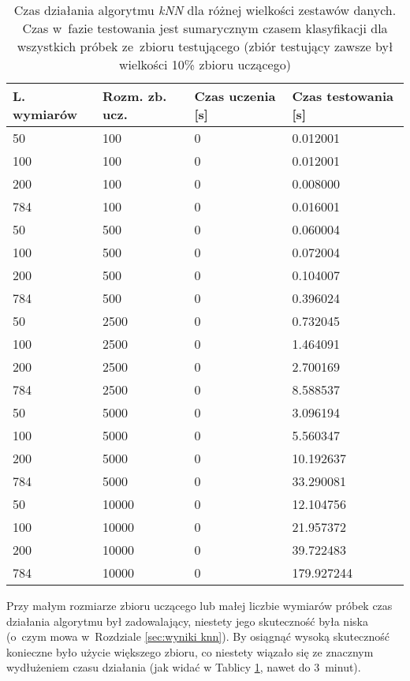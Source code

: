 \documentclass[12pt]{article}
\begin{document}
\begin{table}[H]
\begin{center}
  \begin{tabular}[H]{|l|l|l|l|}
  \hline 
  \rowcolor[gray]{0.9}L. wymiarów & Rozm. zb. ucz. & Czas uczenia [s] & Czas testowania [s]  \\ \hline \hline
  50 &100  & 0 &  0.012001 \\ \hline 
			        100 &100  & 0 &  0.012001 \\ \hline 
			        200 &100  & 0 &  0.008000 \\ \hline  
			        784 &100  & 0 & 0.016001 \\ \hline  
\hline
			        50 &500  & 0 & 0.060004 \\ \hline 
			        100& 500  & 0 & 0.072004 \\ \hline 
			        200& 500  & 0 & 0.104007 \\ \hline 
			        784 &500  & 0 & 0.396024 \\ \hline 
\hline
			        50 &2500  & 0 &  0.732045 \\ \hline  
			        100& 2500  & 0 & 1.464091 \\ \hline  
			        200 &2500  & 0 &  2.700169 \\ \hline 
			        784 &2500 & 0 & 8.588537 \\ \hline  
\hline
			        50 &5000 & 0 & 3.096194 \\ \hline 
			        100 &5000 & 0 & 5.560347 \\ \hline 
			       200 &5000 & 0 & 10.192637 \\ \hline 
			        784 &5000 & 0 & 33.290081 \\ \hline  
\hline
			       50 &10000 & 0 &12.104756 \\ \hline  
			        100 &10000 & 0 &21.957372 \\ \hline  
			        200 &10000 & 0 & 39.722483 \\ \hline 
			        784 &10000 & 0 & 179.927244 \\ \hline 
  \end{tabular} 
\end{center}
 \caption{Czas działania algorytmu \emph{kNN} dla różnej wielkości zestawów danych. Czas w~fazie testowania jest sumarycznym czasem klasyfikacji dla wszystkich próbek ze~zbioru testującego (zbiór testujący zawsze był wielkości 10\% zbioru uczącego)} 
\label{tab: czas knn}
\end{table}

Przy małym rozmiarze zbioru uczącego lub małej liczbie wymiarów próbek czas działania algorytmu był zadowalający, niestety jego skuteczność była niska (o~czym mowa w~Rozdziale \ref{sec:wyniki knn}). By osiągnąć wysoką skuteczność
konieczne było użycie większego zbioru, co niestety wiązało się ze znacznym wydłużeniem czasu działania (jak widać w Tablicy \ref{tab: czas knn}, nawet do 3~minut).
\end{document}
